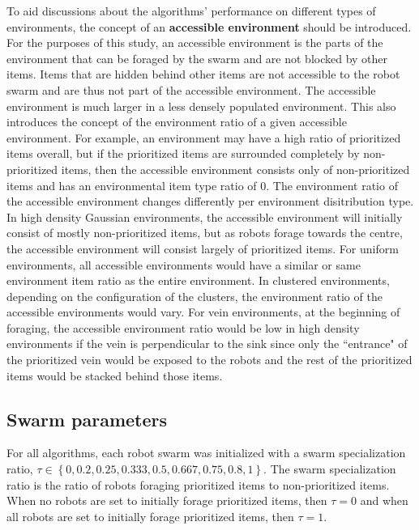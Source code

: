 \documentclass[preprint,12pt]{elsarticle}
\begin{document}
To aid discussions about the algorithms' performance on different types of environments, the concept of an \textbf{accessible environment} should be introduced. For the purposes of this study, an accessible environment is the parts of the environment that can be foraged by the swarm and are not blocked by other items. Items that are hidden behind other items are not accessible to the robot swarm and are thus not part of the accessible environment. The accessible environment is much larger in a less densely populated environment. This also introduces the concept of the environment ratio of a given accessible environment. For example, an environment may have a high ratio of prioritized items overall, but if the prioritized items are surrounded completely by non-prioritized items, then the accessible environment consists only of non-prioritized items and has an environmental item type ratio of 0. The environment ratio of the accessible environment changes differently per environment disitribution type. In high density Gaussian environments, the accessible environment will initially consist of mostly non-prioritized items, but as robots forage towards the centre, the accessible environment will consist largely of prioritized items. For uniform environments, all accessible environments would have a similar or same environment item ratio as the entire environment. In clustered environments, depending on the configuration of the clusters, the environment ratio of the accessible environments would vary. For vein environments, at the beginning of foraging, the accessible environment ratio would be low in high density environments if the vein is perpendicular to the sink since only the ``entrance" of the prioritized vein would be exposed to the robots and the rest of the prioritized items would be stacked behind those items. 

\subsection{Swarm parameters}
\label{swarmparameters}

For all algorithms, each robot swarm was initialized with a swarm specialization ratio, $\tau\in\left\{0, 0.2, 0.25, 0.333, 0.5, 0.667, 0.75, 0.8,1\right\}$. The swarm specialization ratio is the ratio of robots foraging prioritized items to non-prioritized items. When no robots are set to initially forage prioritized items, then $\tau=0$ and when all robots are set to initially forage prioritized items, then $\tau=1$.
\end{document}
